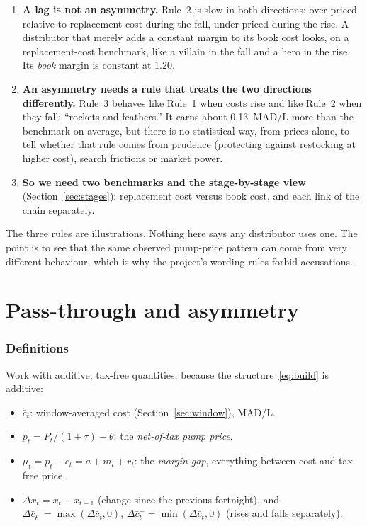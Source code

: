 \documentclass[11pt,a4paper]{article}
\theoremstyle{definition}
\begin{document}
\begin{keyidea}
\begin{enumerate}[leftmargin=1.5em]
\item \textbf{A lag is not an asymmetry.} Rule~2 is slow in both directions: over-priced relative to replacement cost during the fall, under-priced
  during the rise. A distributor that merely adds a constant margin to its book cost looks, on a replacement-cost benchmark, like a villain in the fall
  and a hero in the rise. Its \emph{book} margin is constant at 1.20.
\item \textbf{An asymmetry needs a rule that treats the two directions differently.} Rule~3 behaves like Rule~1 when costs rise and
  like Rule~2 when they fall: ``rockets and feathers.'' It earns about 0.13~MAD/L more than the benchmark on average, but there is no
  statistical way, from prices alone, to tell whether that rule comes from prudence (protecting against restocking at higher cost), search frictions
  or market power.
\item \textbf{So we need two benchmarks and the stage-by-stage view} (Section~\ref{sec:stages}): replacement cost versus book cost,
  and each link of the chain separately.
\end{enumerate}
\end{keyidea}

\begin{warning}
The three rules are illustrations. Nothing here says any distributor uses one. The point is to see that the same observed pump-price pattern can
come from very different behaviour, which is why the project's wording rules forbid accusations.
\end{warning}

\part{Pass-through and asymmetry}

\section{Definitions}

Work with additive, tax-free quantities, because the structure~\eqref{eq:build} is additive:
\begin{itemize}
\item $\bar c_t$: window-averaged cost (Section~\ref{sec:window}), MAD/L.
\item $p_t = P_t/(1+\tau) - \theta$: the \emph{net-of-tax pump price}.
\item $\mu_t = p_t - \bar c_t = a + m_t + r_t$: the \emph{margin gap}, everything between cost and tax-free price.
\item $\Delta x_t = x_t - x_{t-1}$ (change since the previous fortnight), and
  $\Delta\bar c^{+}_t = \max(\Delta\bar c_t,0)$, $\Delta\bar c^{-}_t=\min(\Delta\bar c_t,0)$ (rises and falls separately).
\end{itemize}
\end{document}
